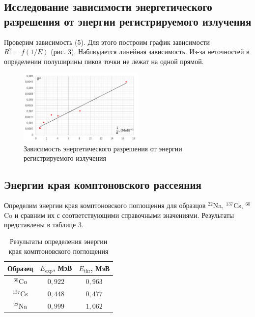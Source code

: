 \documentclass[a4paper]{article}
\begin{document}
\subsection{Исследование зависимости энергетического разрешения от энергии регистрируемого излучения}

\noindent Проверим зависимость (5). Для этого построим график зависимости $R^2 = f(1/E)$ (рис. 3). Наблюдается линейная зависимость. Из-за неточностей в определении полуширины пиков точки не лежат на одной прямой.

\begin{figure}[!ht]
    \begin{center}
        \includegraphics[width = 0.55\textwidth]{image/gr2.png}
        \caption{Зависимость энергетического разрешения от энергии регистрируемого излучения}
    \end{center}
\end{figure}

\newpage

\subsection{Энергии края комптоновского рассеяния}

\noindent Определим энергии края комптоновского поглощения для образцов $^{22}$Na, $^{137}$Cs, $^{60}$Co и сравним их с соответствующими справочными значениями. Результаты представлены в таблице 3.

\begin{table}[!ht]
    \centering
    \caption{Результаты определения энергии края комптоновского поглощения}
    \begin{tabular}{|c|c|c|}
    \hline
    Образец & $E_{\text{exp}}$, МэВ & $E_{\text{thr}}$, МэВ \\ \hline
    $^{60}$Co      & $0,922$               & $0,963$               \\ \hline
    $^{137}$Cs      & $0,448$               & $0,477$               \\ \hline
    $^{22}$Na      & $0,999$               & $1,062$               \\ \hline
    \end{tabular}
    \end{table}
\end{document}
